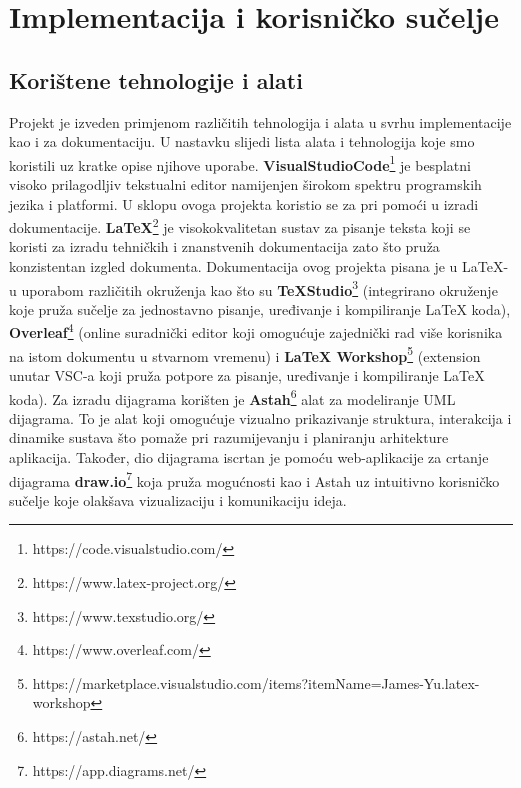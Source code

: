 \chapter{Implementacija i korisničko sučelje}
		
		
		\section{Korištene tehnologije i alati}
		
			
			\noindent Projekt je izveden primjenom različitih tehnologija i alata u svrhu implementacije kao i za dokumentaciju. U nastavku slijedi lista alata i tehnologija koje smo koristili uz kratke opise njihove uporabe.
			\newline\newline
			\noindent\textbf{VisualStudioCode}\footnote[1]{https://code.visualstudio.com/} je besplatni visoko prilagodljiv tekstualni editor namijenjen širokom spektru programskih jezika i platformi. U sklopu ovoga projekta koristio se za pri pomoći u izradi dokumentacije. \textbf{LaTeX}\footnote[2]{https://www.latex-project.org/} je visokokvalitetan sustav za pisanje teksta koji se koristi za izradu tehničkih i znanstvenih dokumentacija zato što pruža konzistentan izgled dokumenta. Dokumentacija ovog projekta pisana je u LaTeX-u uporabom različitih okruženja kao što su \textbf{TeXStudio}\footnote[3]{https://www.texstudio.org/} (integrirano okruženje koje pruža sučelje za jednostavno pisanje, uređivanje i kompiliranje LaTeX koda), \textbf{Overleaf}\footnote[4]{https://www.overleaf.com/} (online suradnički editor koji omogućuje zajednički rad više korisnika na istom dokumentu u stvarnom vremenu) i \textbf{LaTeX Workshop}\footnote[5]{https://marketplace.visualstudio.com/items?itemName=James-Yu.latex-workshop} (extension unutar VSC-a koji pruža potpore za pisanje, uređivanje i kompiliranje LaTeX koda). Za izradu dijagrama korišten je \textbf{Astah}\footnote[6]{https://astah.net/} alat za modeliranje UML dijagrama. To je alat koji omogućuje vizualno prikazivanje struktura, interakcija i dinamike sustava što pomaže pri razumijevanju i planiranju arhitekture aplikacija. Također, dio dijagrama iscrtan je pomoću web-aplikacije za crtanje dijagrama \textbf{draw.io}\footnote[7]{https://app.diagrams.net/} koja pruža mogućnosti kao i Astah uz intuitivno korisničko sučelje koje olakšava vizualizaciju i komunikaciju ideja.
